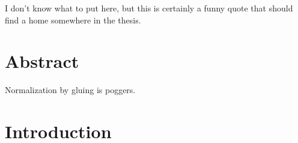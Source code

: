 \documentclass[12pt,twoside]{reedthesis}
\theoremstyle{definition}
\theoremstyle{remark}
\theoremstyle{plain}
\begin{document}
I don't know what to put here, but this is certainly a funny quote that should
find a home somewhere in the thesis.



\tableofcontents
\listoftables
\listoffigures

\chapter*{Abstract}
Normalization by gluing is poggers.



\mainmatter%
\pagestyle{fancyplain} %


\chapter*{Introduction}

\end{document}
